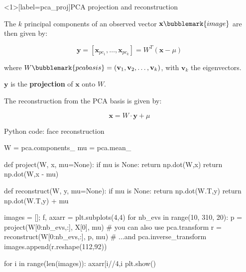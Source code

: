 \documentclass[compress]{beamer}
\begin{document}

\begin{frame}<1>[label=pca_proj]{PCA projection and reconstruction}

    The $k$ principal components of an observed vector
    $\mathbf{x}\bubblemark{image}$ are then given by:

    \[
        \mathbf{y} = [\mathbf{x}_{pc_1},\ldots,\mathbf{x}_{pc_k}] = W^{T} (\mathbf{x} - \mu)
    \]

    \vspace{2em}
    where $W\bubblemark{pcabasis} = (\mathbf{v}_{1}, \mathbf{v}_{2}, \ldots,
    \mathbf{v}_{k})$, with $\mathbf{v}_{k}$ the eigenvectors.

    $\mathbf{y}$ is the \textbf{projection} of $\mathbf{x}$ onto $W$.
    


    \pause
    The reconstruction from the PCA basis is given by:

    \[
        \mathbf{x} = W \cdot \mathbf{y} + \mu
    \]

\end{frame}




\begin{frame}[fragile]{Python code: face reconstruction}

\begin{pythoncode}
W = pca.components_
mu = pca.mean_

def project(W, x, mu=None):
    if mu is None:
        return np.dot(W,x)
    return np.dot(W,x - mu)

def reconstruct(W, y, mu=None):
    if mu is None:
        return np.dot(W.T,y)
    return np.dot(W.T,y) + mu

images = []; f, axarr = plt.subplots(4,4)
for nb_evs in range(10, 310, 20):
    p = project(W[0:nb_evs,:], X[0], mu) # you can also use pca.transform
    r = reconstruct(W[0:nb_evs,:], p, mu) # ...and pca.inverse_transform
    images.append(r.reshape(112,92))

for i in range(len(images)):
    axarr[i//4,i%
plt.show()
\end{pythoncode}
\end{frame}
\end{document}

